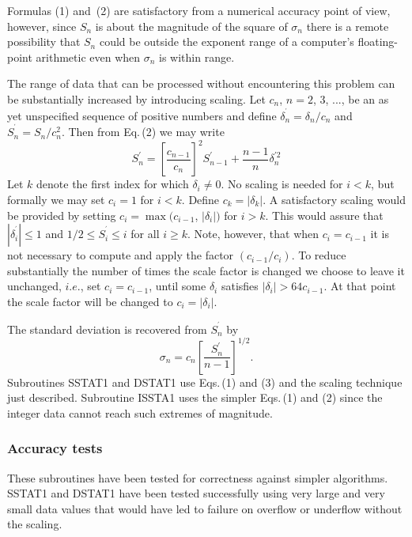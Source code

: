 \documentclass[twoside]{MATH77}
\begin{document}
Formulas (1) and~(2) are satisfactory from a numerical accuracy point of view,
however, since $S_n$ is about the magnitude of the square of $\sigma _n$
there is a remote possibility that $S_n$ could be outside the exponent range
of a computer's floating-point arithmetic even when $\sigma _n$ is within
range.

The range of data that can be processed without encountering this problem
can be substantially increased by introducing scaling. Let $c_n$, $n=2$, 3,
..., be an as yet unspecified sequence of positive numbers and define $%
\delta _n^{^{\prime }}=\delta _n/c_n$ and $S_n^{^{\prime }}=S_n/c_n^2$. Then
from Eq.\,(2) we may write
\begin{equation}
\label{O3}S_n^{\prime }=\left[ \frac{c_{n-1}}{c_n}\right] ^2S_{n-1}^{\prime
}+\frac{n-1}n\delta _n^{\prime 2}
\end{equation}
Let $k$ denote the first index for which $\delta _i\neq 0$. No scaling is
needed for $i<k$, but formally we may set $c_i=1$ for $i<k$. Define $%
c_k=|\delta _k|$. A satisfactory scaling would be provided by
setting $c_i=\max (c_{i-1}$, $|\delta _i|)$ for $i>k$. This would
assure that $|\delta _i^{^{\prime }}|\leq 1$ and $1/2\leq
S_i^{^{\prime }}\leq i$ for all $i\geq k$. Note, however, that when $%
c_i=c_{i-1}$ it is not necessary to compute and apply the factor $(c_{i-1}/c_i)
$. To reduce substantially the number of times the scale factor is changed
we choose to leave it unchanged, $i.e.$, set $c_i=c_{i-1}$, until some $%
\delta _i$ satisfies $|\delta _i|>64c_{i-1}$. At that point the
scale factor will be changed to $c_i=|\delta _i|.$

The standard deviation is recovered from $S_n^{^{\prime }}$ by%
\begin{equation*}
\sigma _n=c_n\left[ \frac{S_n^{\prime }}{n-1}\right] ^{1/2}.
\end{equation*}
Subroutines SSTAT1 and DSTAT1 use Eqs.\,(1) and (3) and the scaling technique
just described. Subroutine ISSTA1 uses the simpler Eqs.\,(1) and (2) since
the integer data cannot reach such extremes of magnitude.

\subsubsection{Accuracy tests}

These subroutines have been tested for correctness against simpler
algorithms. SSTAT1 and DSTAT1 have been tested successfully using very large
and very small data values that would have led to failure on overflow or
underflow without the scaling.
\end{document}
